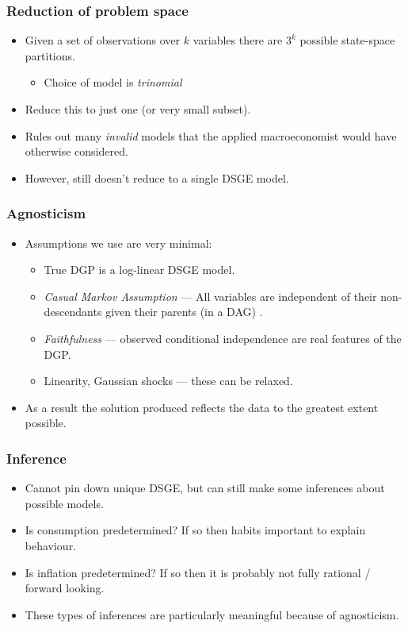 \documentclass{beamer}
\begin{document}
\begin{frame}
    \frametitle{Reduction of problem space}
    \begin{itemize}
        \item Given a set of observations over $k$ variables there are $3^k$ possible state-space partitions.
        \begin{itemize}
            \item Choice of model is \textit{trinomial}
        \end{itemize}
        \item Reduce this to just one (or very small subset).
        \item Rules out many \textit{invalid} models that the applied macroeconomist would have otherwise considered.
        \item However, still doesn't reduce to a single DSGE model.
    \end{itemize}
\end{frame}

\begin{frame}
    \frametitle{Agnosticism}
    \begin{itemize}
        \item Assumptions we use are very minimal:
        \begin{itemize}
            \item True DGP is a log-linear DSGE model.
            \item \textit{Casual Markov Assumption} --- All variables are independent of their non-descendants given their parents (in a DAG) \parencite{spirtes2016causal}.
            \item \textit{Faithfulness} --- observed conditional independence are real features of the DGP.
            \item Linearity, Gaussian shocks --- these can be relaxed.
        \end{itemize}
        \item As a result the solution produced reflects the data to the greatest extent possible.
    \end{itemize}
\end{frame}

\begin{frame}
    \frametitle{Inference}
    \begin{itemize}
        \item Cannot pin down unique DSGE, but can still make some inferences about possible models.
        \item Is consumption predetermined? If so then habits important to explain behaviour.
        \item Is inflation predetermined? If so then it is probably not fully rational / forward looking.
        \item These types of inferences are particularly meaningful because of agnosticism.
    \end{itemize}
\end{frame}
\end{document}
